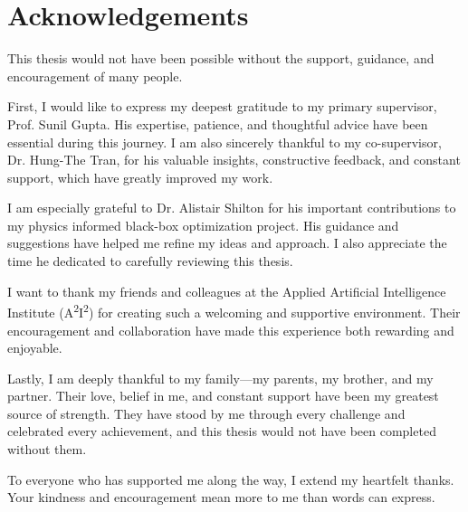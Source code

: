 \chapter*{Acknowledgements}
{}
\vspace*{\fill}
\noindent This thesis would not have been possible without the support, guidance, and encouragement of many people.

First, I would like to express my deepest gratitude to my primary supervisor, Prof. Sunil Gupta. His expertise, patience, and thoughtful advice have been essential during this journey. I am also sincerely thankful to my co-supervisor, Dr. Hung-The Tran, for his valuable insights, constructive feedback, and constant support, which have greatly improved my work.

I am especially grateful to Dr. Alistair Shilton for his important contributions to my physics informed black-box optimization project. His guidance and suggestions have helped me refine my ideas and approach. I also appreciate the time he dedicated to carefully reviewing this thesis.

I want to thank my friends and colleagues at the Applied Artificial Intelligence Institute (A\textsuperscript{2}I\textsuperscript{2}) for creating such a welcoming and supportive environment. Their encouragement and collaboration have made this experience both rewarding and enjoyable.

Lastly, I am deeply thankful to my family—my parents, my brother, and my partner. Their love, belief in me, and constant support have been my greatest source of strength. They have stood by me through every challenge and celebrated every achievement, and this thesis would not have been completed without them.

To everyone who has supported me along the way, I extend my heartfelt thanks. Your kindness and encouragement mean more to me than words can express.
\vspace*{\fill}
\cleardoublepage
\pagestyle{plain}